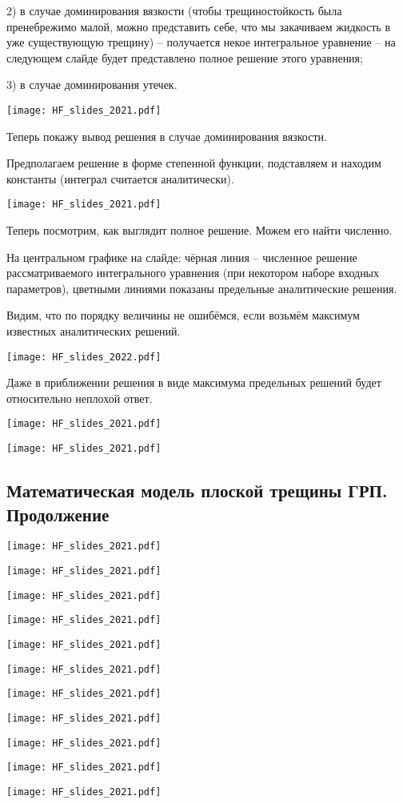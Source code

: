 \documentclass[main.tex]{subfiles}
\begin{document}
2) в случае доминирования вязкости (чтобы трещиностойкость была пренебрежимо малой, можно представить себе, что мы закачиваем жидкость в уже существующую трещину) -- получается некое интегральное уравнение -- на следующем слайде будет представлено полное решение этого уравнения;

3) в случае доминирования утечек.

\texttt{[image: HF\_slides\_2021.pdf]}

Теперь покажу вывод решения в случае доминирования вязкости.

Предполагаем решение в форме степенной функции, подставляем и находим константы (интеграл считается аналитически).

\texttt{[image: HF\_slides\_2021.pdf]}

Теперь посмотрим, как выглядит полное решение.
Можем его найти численно.

На центральном графике на слайде: чёрная линия -- численное решение рассматриваемого интегрального уравнения (при некотором наборе входных параметров), цветными линиями показаны предельные аналитические решения.

Видим, что по порядку величины не ошибёмся, если возьмём максимум известных аналитических решений.

\texttt{[image: HF\_slides\_2022.pdf]}

Даже в приближении решения в виде максимума предельных решений будет относительно неплохой ответ.

\texttt{[image: HF\_slides\_2021.pdf]}

\texttt{[image: HF\_slides\_2021.pdf]}

\subsection{Математическая модель плоской трещины ГРП. Продолжение}

\texttt{[image: HF\_slides\_2021.pdf]}

\texttt{[image: HF\_slides\_2021.pdf]}

\texttt{[image: HF\_slides\_2021.pdf]}

\texttt{[image: HF\_slides\_2021.pdf]}

\texttt{[image: HF\_slides\_2021.pdf]}

\texttt{[image: HF\_slides\_2021.pdf]}

\texttt{[image: HF\_slides\_2021.pdf]}

\texttt{[image: HF\_slides\_2021.pdf]}

\texttt{[image: HF\_slides\_2021.pdf]}

\texttt{[image: HF\_slides\_2021.pdf]}

\texttt{[image: HF\_slides\_2021.pdf]}
\end{document}
